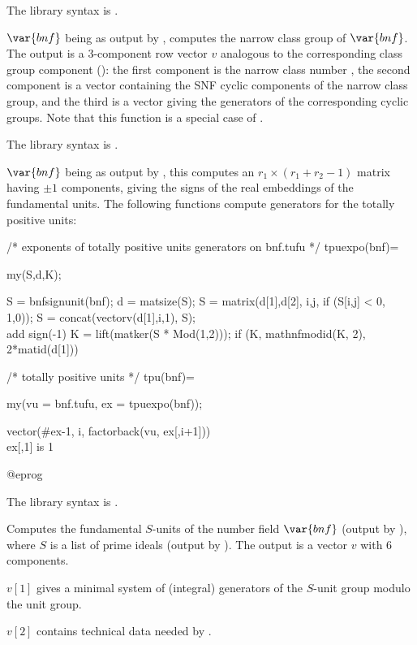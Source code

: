 The library syntax is .

\label{se:bnfnarrow}
$\var{bnf}$ being as output by
, computes the narrow class group of $\var{bnf}$. The output is
a 3-component row vector $v$ analogous to the corresponding class group
component  (): the first component
is the narrow class number , the second component is a vector
containing the SNF cyclic components  of
the narrow class group, and the third is a vector giving the generators of
the corresponding  cyclic groups. Note that this function is a
special case of .

The library syntax is .

\label{se:bnfsignunit}
$\var{bnf}$ being as output by
, this computes an $r_1\times(r_1+r_2-1)$ matrix having $\pm1$
components, giving the signs of the real embeddings of the fundamental units.
The following functions compute generators for the totally positive units:

\bprog
/* exponents of totally positive units generators on bnf.tufu */
tpuexpo(bnf)=
{ my(S,d,K);

  S = bnfsignunit(bnf); d = matsize(S);
  S = matrix(d[1],d[2], i,j, if (S[i,j] < 0, 1,0));
  S = concat(vectorv(d[1],i,1), S);   \\ add sign(-1)
  K = lift(matker(S * Mod(1,2)));
  if (K, mathnfmodid(K, 2), 2*matid(d[1]))
}

/* totally positive units */
tpu(bnf)=
{ my(vu = bnf.tufu, ex = tpuexpo(bnf));

  vector(#ex-1, i, factorback(vu, ex[,i+1]))  \\ ex[,1] is 1
}
@eprog

The library syntax is .

\label{se:bnfsunit}
Computes the fundamental $S$-units of the
number field $\var{bnf}$ (output by ), where $S$ is a list of
prime ideals (output by ). The output is a vector $v$ with
6 components.

$v[1]$ gives a minimal system of (integral) generators of the $S$-unit group
modulo the unit group.

$v[2]$ contains technical data needed by .

